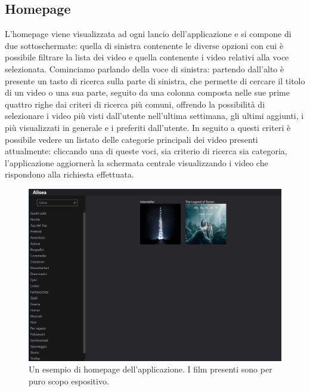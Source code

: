 \documentclass[a4]{book}
\begin{document}
\subsection{Homepage}
L'homepage viene visualizzata ad ogni lancio dell'applicazione e si compone di due sottoschermate: quella di sinistra contenente le diverse opzioni con cui è possibile filtrare la lista dei video e quella contenente i video relativi alla voce selezionata. Cominciamo parlando della voce di sinistra: partendo dall'alto è presente  un tasto di ricerca sulla parte di sinistra, che permette di cercare il titolo di un video o una sua parte, seguito da una colonna composta nelle sue prime quattro righe dai criteri di ricerca più comuni, offrendo la possibilità di selezionare i video più visti dall'utente nell'ultima settimana, gli ultimi aggiunti, i più visualizzati in generale e i preferiti dall'utente. In seguito a questi criteri è possibile vedere un listato delle categorie principali dei video presenti attualmente: cliccando una di queste voci, sia criterio di ricerca sia categoria, l'applicazione aggiornerà la schermata centrale visualizzando i video che rispondono alla richiesta effettuata.
\begin{center}
	\begin{figure}[h!]
		\includegraphics[width=\textwidth]{homepage}
		\caption{Un esempio di homepage dell'applicazione. I film presenti sono per puro scopo espositivo.}
	\end{figure}
\end{center}
\end{document}
